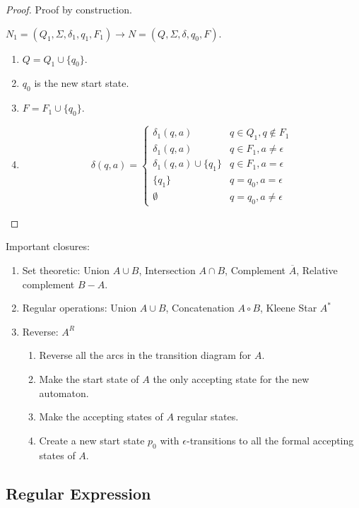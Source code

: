 \begin{mdframed}
\begin{proof}
Proof by construction.

$N_1 = (Q_1, \Sigma, \delta_1, q_1, F_1 ) \rightarrow N = (Q, \Sigma, \delta, q_0, F)$.

\begin{enumerate}
\item $Q = Q_1 \cup \{q_0\}$.

\item $q_0$ is the new start state.

\item $F = F_1 \cup \{q_0\}$.

\item 
\[
\delta(q, a) = \begin{cases}
\delta_1(q, a) 	  			    &q \in Q_1, q \not \in F_1\\
\delta_1(q, a)					&q \in F_1, a \neq \epsilon\\
\delta_1(q, a) \cup \{q_1\} 	&q \in F_1, a = \epsilon \\
\{q_1\}					   		&q = q_0, a = \epsilon \\
\emptyset    					&q = q_0, a \neq \epsilon
\end{cases}
\]
\end{enumerate}
\end{proof}
\end{mdframed}

Important closures:
\begin{enumerate}
\item Set theoretic: Union $A\cup B$, Intersection $A\cap B$, Complement $\overline{A}$, Relative complement $B - A$.
\item Regular operations: Union $A\cup B$, Concatenation $A\circ B$, Kleene Star $A^*$
\item Reverse: $A^R$
\begin{enumerate}
\item Reverse all the arcs in the transition diagram for $A$.
\item Make the start state of $A$ the only accepting state for the new automaton.
\item Make the accepting states of $A$ regular states.
\item Create a new start state $p_0$ with $\epsilon$-transitions to all the formal accepting states of $A$.
\end{enumerate}
\end{enumerate}

\subsection{Regular Expression}

